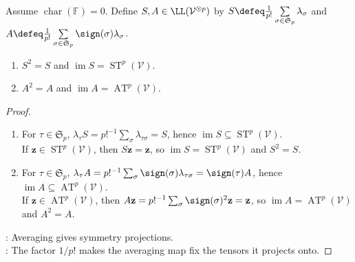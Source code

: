\begin{proposition} \label{prop:symmetrization-map} \\
Assume $\operatorname{char}(\mathbb{F})=0$. Define $S,A\in\LL(\mathcal{V}^{\otimes p})$ by $S\defeq\frac{1}{p!}\sum\limits_{\sigma\in\mathfrak{S}_p}\lambda_{\sigma}$ and $A\defeq\frac{1}{p!}\sum\limits_{\sigma\in\mathfrak{S}_p}\sign(\sigma)\lambda_{\sigma}$.
\begin{enumerate}[label=(\roman*)]
\setlength{\itemsep}{0pt}
\item $S^2=S$ and $\operatorname{im}S=\operatorname{ST}^{p}(\mathcal{V})$.
\item $A^2=A$ and $\operatorname{im}A=\operatorname{AT}^{p}(\mathcal{V})$.
\end{enumerate}
\begin{proof}
\begin{enumerate}[label=(\roman*)]
\setlength{\itemsep}{0pt}
\item For $\tau\in\mathfrak{S}_p$, $\lambda_{\tau}S=p!^{-1}\sum_{\sigma}\lambda_{\tau\sigma}=S$, hence $\operatorname{im}S\subseteq\operatorname{ST}^{p}(\mathcal{V})$.\\
If $\mathbf{z}\in\operatorname{ST}^{p}(\mathcal{V})$, then $S\mathbf{z}=\mathbf{z}$, so $\operatorname{im}S=\operatorname{ST}^{p}(\mathcal{V})$ and $S^2=S$.
\item For $\tau\in\mathfrak{S}_p$, $\lambda_{\tau}A=p!^{-1}\sum_{\sigma}\sign(\sigma)\lambda_{\tau\sigma}=\sign(\tau)A$, hence $\operatorname{im}A\subseteq\operatorname{AT}^{p}(\mathcal{V})$.\\
If $\mathbf{z}\in\operatorname{AT}^{p}(\mathcal{V})$, then $A\mathbf{z}=p!^{-1}\sum_{\sigma}\sign(\sigma)^2\mathbf{z}=\mathbf{z}$, so $\operatorname{im}A=\operatorname{AT}^{p}(\mathcal{V})$ and $A^2=A$.
\end{enumerate}
: Averaging gives symmetry projections.\\
: The factor $1/p!$ makes the averaging map fix the tensors it projects onto.
\end{proof}
\end{proposition}
